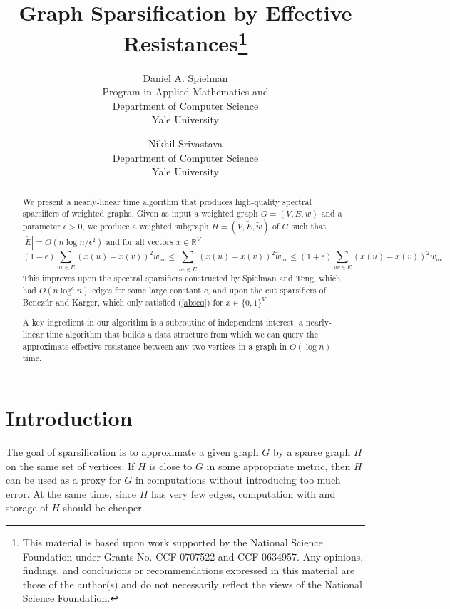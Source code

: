 \documentclass[11pt]{article}
\newcommand{\R}{\mathbb{R}}
\begin{document}
\title{Graph Sparsification by Effective Resistances\thanks{
This material is based upon work supported by the National Science Foundation
under Grants No. CCF-0707522 and CCF-0634957.
Any opinions, findings, and conclusions or recommendations expressed in this material are those of the author(s) and do not necessarily reflect the views of the National Science Foundation.
}} 
\author{
Daniel A. Spielman\\
Program in Applied Mathematics and \\
Department of Computer Science \\
Yale University
\and
Nikhil Srivastava\\
Department of Computer Science \\
Yale University
}

\maketitle
\begin{abstract}
We present a nearly-linear time algorithm that produces high-quality spectral sparsifiers
of weighted graphs. Given as input a weighted graph $G=(V,E,w)$ and a parameter
$\epsilon>0$, we produce a weighted subgraph $H=(V,\tilde{E},\tilde{w})$ of $G$
such that $|\tilde{E}|=O(n\log n/\epsilon^2)$ and for all vectors $x\in\R^V$
\begin{equation}\label{abseq} (1-\epsilon)\sum_{uv\in E}(x(u)-x(v))^2w_{uv}\le \sum_{uv\in
\tilde{E}}(x(u)-x(v))^2\tilde{w}_{uv} \le
(1+\epsilon)\sum_{uv\in E}(x(u)-x(v))^2w_{uv}.\end{equation}
This improves upon the spectral sparsifiers constructed by Spielman and Teng, which had
$O(n\log^c n)$ edges for some large constant $c$, and upon 
  the cut sparsifiers of Bencz\'ur and Karger, which only
satisfied (\ref{abseq}) for $x\in\{0,1\}^V$.


A key ingredient in our algorithm is a subroutine of independent interest: a
nearly-linear time algorithm that builds a data structure from which we can
query the approximate effective resistance between any two vertices in a graph in $O(\log
n)$ time.

\end{abstract}
\section{Introduction}
The goal of sparsification is to approximate a given graph $G$ by a
sparse graph $H$ on the same set of vertices. If $H$ is close to $G$ in some
appropriate metric, then $H$ can be used as a proxy for $G$ in computations
without introducing too much error. At the same time, since $H$ has very few
edges, computation with and storage of $H$ should be cheaper. 
\end{document}
